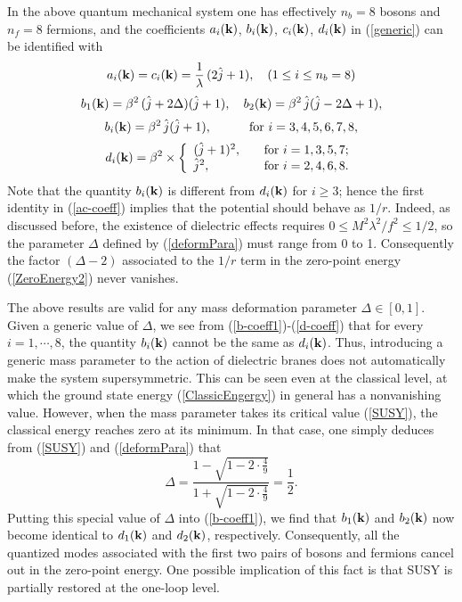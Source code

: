 \documentclass[a4paper,12pt]{article}
\begin{document}
{In the above quantum mechanical system one has effectively $n_{b}=8$ bosons and $n_{f}=8$ fermions, and the coefficients $a_{i}({\bf k})$, $b_{i}({\bf k})$, $c_{i}({\bf k})$, $d_{i}({\bf k})$ in (\ref{generic}) can be identified with
\begin{equation}
a_{i}({\bf k})=c_{i}({\bf k})=\frac{1}{\lambda}\,(2\hat{j}+1),\quad (1\leq i\leq n_{b}=8)
\label{ac-coeff}
\end{equation}
\begin{equation}
b_{1}({\bf k})=\beta^{2}\,(\hat{j}+2\Delta)(\hat{j}+1),\quad b_{2}({\bf k})=\beta^{2}\,\hat{j}(\hat{j}-2\Delta+1),
\label{b-coeff1}
\end{equation}
\begin{equation}
b_{i}({\bf k})=\beta^{2}\,\hat{j}(\hat{j}+1),\quad\quad\quad \hbox{for $i=3,4,5,6,7,8$},
\label{b-coeff2}
\end{equation}
\begin{equation}
d_{i}({\bf k})=\beta^{2}\times\left\{
                \begin{array}{ll}
                   (\hat{j}+1)^{2},\quad  & \hbox{for $i=1,3,5,7$;}\\
                    \hat{j}^{2},    &   \hbox{for $i=2,4,6,8$.}
                \end{array}                  
\right.
\label{d-coeff}
\end{equation}
Note that the quantity $b_{i}({\bf k})$ is different from $d_{i}({\bf k})$ for $i\geq 3$; hence the first identity in (\ref{ac-coeff}) implies that the potential should behave as $1/r$. Indeed, as discussed before, the existence of dielectric effects requires $0\leq M^{2}\lambda^{2}/f^{2}\leq 1/2$, so the parameter $\Delta$ defined by (\ref{deformPara}) must range from 0 to 1. Consequently the factor $(\Delta-2)$ associated to the $1/r$ term in the zero-point energy (\ref{ZeroEnergy2}) never vanishes.

The above results are valid for any mass deformation parameter $\Delta\in[0,1]$. Given a generic value of $\Delta$, we see from (\ref{b-coeff1})-(\ref{d-coeff}) that for every $i=1,\cdots,8$, the quantity $b_{i}({\bf k})$ cannot be the same as $d_{i}({\bf k})$. Thus, introducing a generic mass parameter to the action of dielectric branes does not automatically make the system supersymmetric. This can be seen even at the classical level,  at which the ground state energy (\ref{ClassicEngergy}) in general has a nonvanishing value. However, when the mass parameter takes its critical value (\ref{SUSY}), the classical energy reaches zero at its minimum. In that case,  one simply deduces from (\ref{SUSY}) and (\ref{deformPara}) that 
\begin{equation}
\Delta=\frac{1-\sqrt{1-2\cdot\frac{4}{9}}}{1+\sqrt{1-2\cdot\frac{4}{9}}}=\frac{1}{2}.
\end{equation}
Putting this special value of $\Delta$ into (\ref{b-coeff1}), we find that $b_{1}({\bf k})$ and $b_{2}({\bf k})$ now become identical to $d_{1}({\bf k})$ and $d_{2}({\bf k})$, respectively. Consequently, all the quantized modes associated with the first two pairs of bosons and fermions cancel out in the zero-point energy. One possible implication of this fact is that SUSY is partially restored at the one-loop level.
}
\end{document}
